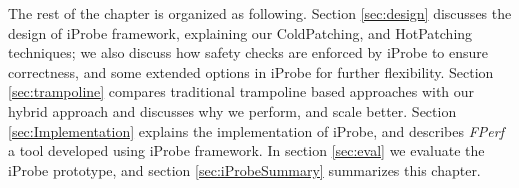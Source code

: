 %




The rest of the chapter is organized as following. 
Section \ref{sec:design} discusses the design of iProbe framework, explaining our ColdPatching, and HotPatching techniques;
we also discuss how safety checks are enforced by iProbe to ensure correctness, and some extended options in iProbe for further flexibility.
Section \ref{sec:trampoline} compares traditional trampoline based approaches with our hybrid approach and discusses why we perform, and scale better.
Section \ref{sec:Implementation} explains the implementation of iProbe, 
and describes \emph{FPerf} a tool developed using iProbe framework. 
In section \ref{sec:eval} we evaluate the iProbe prototype, 
and section \ref{sec:iProbeSummary} summarizes this chapter.
